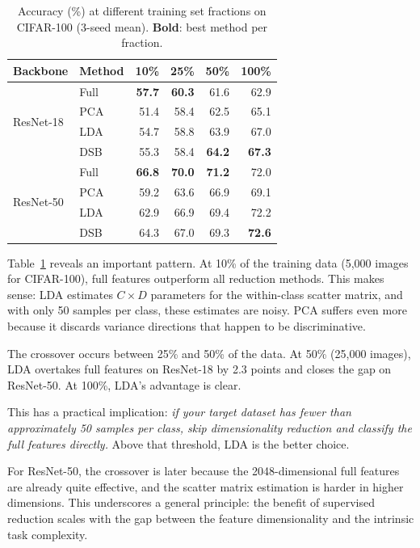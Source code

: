 \begin{table}[t]
\centering
\caption{Accuracy (\%) at different training set fractions on CIFAR-100 (3-seed mean). \textbf{Bold}: best method per fraction.}
\label{tab:data_efficiency}
\small
\begin{tabular}{@{}l l rrrr@{}}
\toprule
Backbone & Method & 10\% & 25\% & 50\% & 100\% \\
\midrule
\multirow{4}{*}{ResNet-18}
& Full & \textbf{57.7} & \textbf{60.3} & 61.6 & 62.9 \\
& PCA  & 51.4 & 58.4 & 62.5 & 65.1 \\
& LDA  & 54.7 & 58.8 & 63.9 & 67.0 \\
& DSB  & 55.3 & 58.4 & \textbf{64.2} & \textbf{67.3} \\
\midrule
\multirow{4}{*}{ResNet-50}
& Full & \textbf{66.8} & \textbf{70.0} & \textbf{71.2} & 72.0 \\
& PCA  & 59.2 & 63.6 & 66.9 & 69.1 \\
& LDA  & 62.9 & 66.9 & 69.4 & 72.2 \\
& DSB  & 64.3 & 67.0 & 69.3 & \textbf{72.6} \\
\bottomrule
\end{tabular}
\end{table}

Table~\ref{tab:data_efficiency} reveals an important pattern. At 10\% of the training data (5,000 images for CIFAR-100), full features outperform all reduction methods. This makes sense: LDA estimates $C \times D$ parameters for the within-class scatter matrix, and with only 50 samples per class, these estimates are noisy. PCA suffers even more because it discards variance directions that happen to be discriminative.

The crossover occurs between 25\% and 50\% of the data. At 50\% (25,000 images), LDA overtakes full features on ResNet-18 by 2.3 points and closes the gap on ResNet-50. At 100\%, LDA's advantage is clear.

This has a practical implication: \emph{if your target dataset has fewer than approximately 50 samples per class, skip dimensionality reduction and classify the full features directly.} Above that threshold, LDA is the better choice.

For ResNet-50, the crossover is later because the 2048-dimensional full features are already quite effective, and the scatter matrix estimation is harder in higher dimensions. This underscores a general principle: the benefit of supervised reduction scales with the gap between the feature dimensionality and the intrinsic task complexity.

